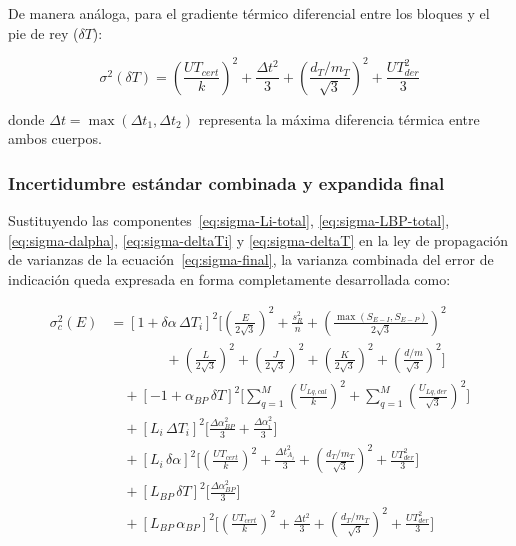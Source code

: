 De manera análoga, para el gradiente térmico diferencial entre los bloques y el pie de rey ($\delta T$):

\begin{equation}
    \sigma^2(\delta T) = \left(\frac{UT_{cert}}{k}\right)^2 + \frac{\Delta t^2}{3} + \left(\frac{d_T / m_T}{\sqrt{3}}\right)^2 + \frac{UT_{der}^2}{3}
    \label{eq:sigma-deltaT}
\end{equation}

donde $\Delta t = \max(\Delta t_1, \Delta t_2)$ representa la máxima diferencia térmica entre ambos cuerpos.

\subsubsection{Incertidumbre estándar combinada y expandida final}

Sustituyendo las componentes~\eqref{eq:sigma-Li-total}, \eqref{eq:sigma-LBP-total}, \eqref{eq:sigma-dalpha}, \eqref{eq:sigma-deltaTi} y \eqref{eq:sigma-deltaT} en la ley de propagación de varianzas de la ecuación~\eqref{eq:sigma-final}, la varianza combinada del error de indicación queda expresada en forma completamente desarrollada como:

\begin{align}
    \sigma_c^2(E) &=
    [1 + \delta\alpha \, \Delta T_i]^2
    \Bigg[
        \left(\frac{E}{2\sqrt{3}}\right)^2
        + \frac{s_R^2}{n}
        + \left(\frac{\max(S_{E-I}, S_{E-P})}{2\sqrt{3}}\right)^2 \nonumber \\
    &\qquad\qquad
        + \left(\frac{L}{2\sqrt{3}}\right)^2
        + \left(\frac{J}{2\sqrt{3}}\right)^2
        + \left(\frac{K}{2\sqrt{3}}\right)^2
        + \left(\frac{d/m}{\sqrt{3}}\right)^2
    \Bigg] \nonumber \\[4pt]
    &\quad + [-1 + \alpha_{BP} \, \delta T]^2
    \Bigg[
        \sum_{q=1}^M \left(\frac{U_{Lq,cal}}{k}\right)^2
        + \sum_{q=1}^M \left(\frac{U_{Lq,der}}{\sqrt{3}}\right)^2
    \Bigg] \nonumber \\[4pt]
    &\quad + [L_i \, \Delta T_i]^2
    \Bigg[
        \frac{\Delta\alpha_{BP}^2}{3} + \frac{\Delta\alpha_i^2}{3}
    \Bigg] \nonumber \\[4pt]
    &\quad + [L_i \, \delta\alpha]^2
    \Bigg[
        \left(\frac{UT_{cert}}{k}\right)^2
        + \frac{\Delta t_{A_i}^2}{3}
        + \left(\frac{d_T / m_T}{\sqrt{3}}\right)^2
        + \frac{UT_{der}^2}{3}
    \Bigg] \nonumber \\[4pt]
    &\quad + [L_{BP} \, \delta T]^2
    \Bigg[
        \frac{\Delta\alpha_{BP}^2}{3}
    \Bigg] \nonumber \\[4pt]
    &\quad + [L_{BP} \, \alpha_{BP}]^2
    \Bigg[
        \left(\frac{UT_{cert}}{k}\right)^2
        + \frac{\Delta t^2}{3}
        + \left(\frac{d_T / m_T}{\sqrt{3}}\right)^2
        + \frac{UT_{der}^2}{3}
    \Bigg] \label{eq:sigma-cuad-expandida}
\end{align}

